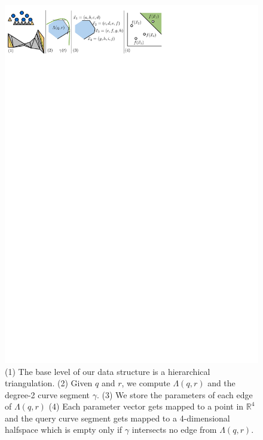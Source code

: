 \documentclass[UKenglish]{lipics-v2019}
\begin{document}
\begin{figure}[tb]
    \centering
    \includegraphics[]{../panel}
    \caption{(1) The base level of our data structure is a hierarchical
      triangulation. (2) Given $q$ and $r$, we compute $\Lambda(q,r)$ and the
      degree-2 curve segment $\gamma$. (3) We store the parameters of each edge
      of $\Lambda(q,r)$ (4) Each parameter vector gets mapped to a point in
      $\mathbb{R}^4$ and the query curve segment gets mapped to a 4-dimensional
      halfspace which is empty only if $\gamma$ intersects no edge from
      $\Lambda(q,r)$.}
    \label{fig:panel}
\end{figure}
\end{document}
